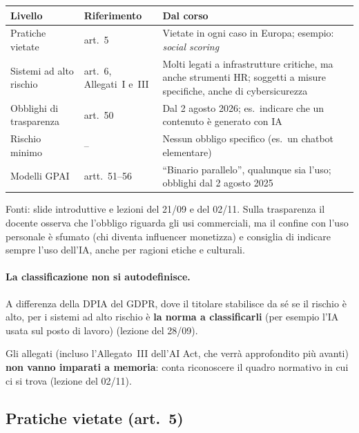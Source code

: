 \begin{center}
\small
\begin{tabularx}{\linewidth}{>{\raggedright\arraybackslash}p{3.6cm} >{\raggedright\arraybackslash}p{2.6cm} X}
\toprule
\textbf{Livello} & \textbf{Riferimento} & \textbf{Dal corso} \\ \midrule
Pratiche vietate & art.~5 & Vietate in ogni caso in Europa; esempio: \emph{social scoring} \\
Sistemi ad alto rischio & art.~6, Allegati~I e~III & Molti legati a infrastrutture critiche, ma
  anche strumenti HR; soggetti a misure specifiche, anche di cybersicurezza \\
Obblighi di trasparenza & art.~50 & Dal 2 agosto 2026; es.\ indicare che un contenuto è generato con
  IA \\
Rischio minimo & -- & Nessun obbligo specifico (es.\ un chatbot elementare) \\
\midrule
Modelli GPAI & artt.~51--56 & ``Binario parallelo'', qualunque sia l'uso; obblighi dal 2 agosto 2025 \\
\bottomrule
\end{tabularx}
\end{center}
\noindent Fonti: slide introduttive e lezioni del 21/09 e del 02/11. Sulla trasparenza il docente
osserva che l'obbligo riguarda gli usi commerciali, ma il confine con l'uso personale è sfumato (chi
diventa influencer monetizza) e consiglia di indicare sempre l'uso dell'IA, anche per ragioni etiche e
culturali.

\paragraph{La classificazione non si autodefinisce.} A differenza della DPIA del GDPR, dove il titolare
stabilisce da sé se il rischio è alto, per i sistemi ad alto rischio è \textbf{la norma a
classificarli} (per esempio l'IA usata sul posto di lavoro) (lezione del 28/09).

\begin{esame}
Gli allegati (incluso l'Allegato~III dell'AI Act, che verrà approfondito più avanti) \textbf{non vanno
imparati a memoria}: conta riconoscere il quadro normativo in cui ci si trova (lezione del 02/11).
\end{esame}

\subsection{Pratiche vietate (art.~5)}
\label{sec:aiact-vietate}
